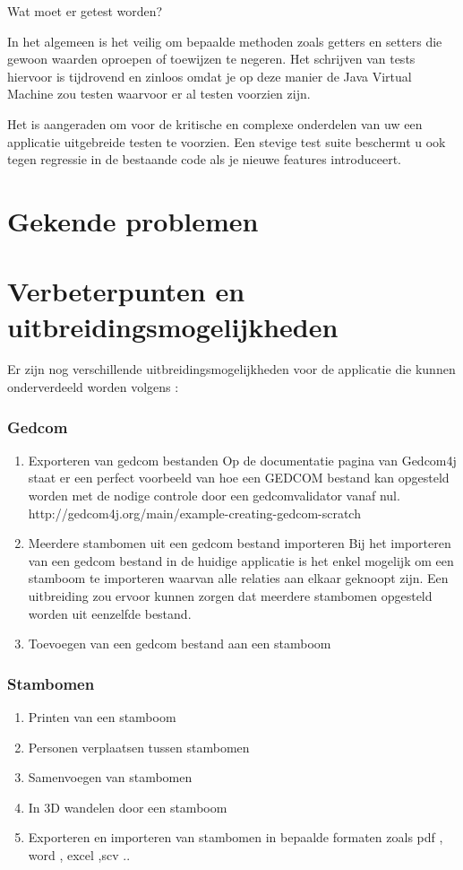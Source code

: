 \documentclass[pdftex,a4paper,12pt,twoside]{report}
\begin{document}
Wat moet er getest worden?

In het algemeen is het veilig om bepaalde methoden zoals getters en setters die gewoon waarden oproepen of toewijzen te negeren. Het schrijven van tests hiervoor is tijdrovend en zinloos omdat je op deze manier de Java Virtual Machine zou testen waarvoor er al testen voorzien zijn.

Het is aangeraden om voor de kritische en complexe onderdelen van uw een applicatie uitgebreide testen te voorzien. Een stevige test suite beschermt u ook tegen regressie in de bestaande code als je nieuwe features introduceert.




\chapter{Gekende problemen}

\chapter{Verbeterpunten en uitbreidingsmogelijkheden}

Er zijn nog verschillende uitbreidingsmogelijkheden voor de applicatie die kunnen onderverdeeld worden volgens :
\subsection{Gedcom}
\begin{enumerate}
\item \label{it:first} Exporteren van gedcom bestanden
	Op de documentatie pagina van Gedcom4j staat er een perfect voorbeeld van hoe een GEDCOM bestand kan opgesteld worden met de nodige controle door een gedcomvalidator vanaf nul.
	http://gedcom4j.org/main/example-creating-gedcom-scratch
\item \label{it:first}  Meerdere stambomen uit een gedcom bestand importeren
	Bij het importeren van een gedcom bestand in de huidige applicatie is het enkel mogelijk om een stamboom te importeren waarvan alle relaties aan elkaar geknoopt zijn.
	Een uitbreiding zou ervoor kunnen zorgen dat meerdere stambomen opgesteld worden uit eenzelfde bestand.
\item \label{it:first} Toevoegen van een gedcom bestand aan een stamboom
\end{enumerate}

 
\subsection{Stambomen}
\begin{enumerate}
\item \label{it:first} Printen van een stamboom
\item \label{it:first} Personen verplaatsen tussen stambomen
\item \label{it:first} Samenvoegen van stambomen
\item \label{it:first} In 3D wandelen door een stamboom
\item \label{it:first} Exporteren en importeren van stambomen in bepaalde formaten zoals pdf , word , excel ,scv ..
\end{enumerate}
\end{document}
